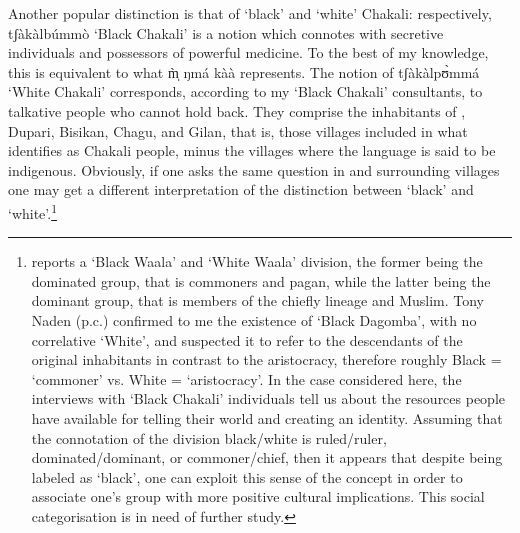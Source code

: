 Another popular distinction is that of `black' and `white' Chakali: respectively,  {\sls tʃàkàlbúmmò} `Black Chakali'  is a notion which connotes with secretive individuals and possessors of powerful medicine. To the best of my knowledge, this is equivalent to what {\sls m̩̀ ŋmá kàà} represents. The notion of  {\sls tʃàkàlpʊ̀mmá}  `White Chakali' corresponds, according to my ‘Black Chakali’ consultants, to talkative people who cannot hold back. They comprise the inhabitants of , Dupari, Bisikan, Chagu, and Gilan, that
is, those villages included in what \citet[2--3]{Daan94} identifies as Chakali people, minus the
villages where the language is said to be indigenous.  Obviously, if one asks the same question
in  and surrounding villages one may get a different interpretation of the distinction
between ‘black’ and ‘white’.\footnote{\citet[14--15]{Good54} reports a `Black Waala' and `White Waala' division, the former being the dominated group, that is commoners and pagan, while the latter being the dominant group, that is members of the chiefly lineage and Muslim. Tony Naden (p.c.) confirmed to me the existence of  `Black Dagomba', with no correlative `White', and suspected it to refer to the descendants of the original inhabitants in contrast to the aristocracy, therefore roughly Black = ‘commoner’ vs. White = ‘aristocracy’. In the case considered here, the interviews with `Black Chakali' individuals tell us about the resources people have available for telling their world and creating an identity. Assuming that the connotation of the division black/white is ruled/ruler, dominated/dominant, or commoner/chief, then it appears that despite being labeled as ‘black’, one can exploit this sense of the concept in order to associate one’s group with more positive cultural implications. This social categorisation is in need of further study.}


